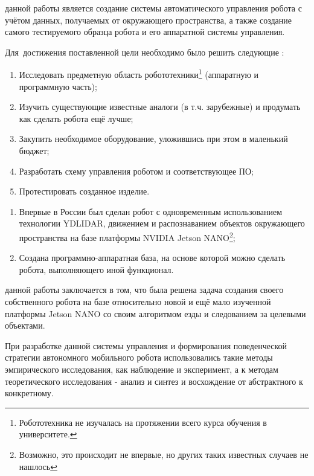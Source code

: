 
{\actuality}

{\progress}

{\aim} данной работы является создание системы автоматического управления робота с учётом данных, получаемых от окружающего пространства, а также создание самого тестируемого образца робота и его аппаратной системы управления. 

Для~достижения поставленной цели необходимо было решить следующие {\tasks}:
\begin{enumerate}
  \item Исследовать предметную область робототехники\footnote{Робототехника не изучалась на протяжении всего курса обучения в университете.} (аппаратную и программную часть);
  \item Изучить существующие известные аналоги (в т.ч. зарубежные) и продумать как сделать робота ещё лучше;
  \item Закупить необходимое оборудование, уложившись при этом в маленький бюджет; 
  \item Разработать схему управления роботом и соответствующее ПО;
  \item Протестировать созданное изделие.
\end{enumerate}


{\novelty}
\begin{enumerate}
  \item Впервые в России был сделан робот с одновременным использованием технологии YDLIDAR, движением и распознаванием объектов окружающего пространства на базе платформы NVIDIA Jetson NANO\footnote{Возможно, это происходит не впервые, но других таких известных случаев не нашлось};
  \item Создана программно-аппаратная база, на основе которой можно сделать робота, выполняющего иной функционал.
\end{enumerate}

{\influence} данной работы заключается в том, что была решена задача создания своего собственного робота на базе относительно новой и ещё мало изученной платформы Jetson NANO со своим алгоритмом езды и следованием за целевыми объектами.

{\methods} При разработке данной системы управления и формирования поведенческой стратегии автономного мобильного робота использовались такие методы эмпирического исследования, как наблюдение и эксперимент, а к методам теоретического исследования - анализ и синтез и восхождение от абстрактного к конкретному.
